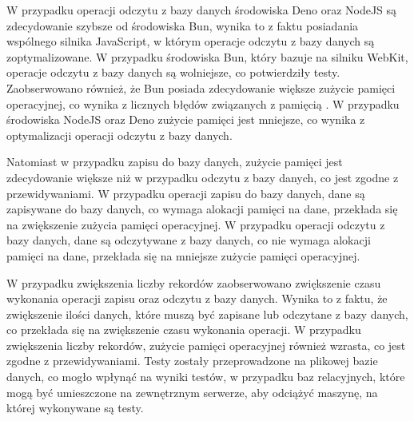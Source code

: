 W przypadku operacji odczytu z bazy danych środowiska Deno oraz NodeJS są zdecydowanie szybsze od środowiska Bun, wynika to z faktu posiadania wspólnego silnika JavaScript, w którym operacje odczytu z bazy danych są zoptymalizowane. W przypadku środowiska Bun, który bazuje na silniku WebKit, operacje odczytu z bazy danych są wolniejsze, co potwierdziły testy. Zaobserwowano również, że Bun posiada zdecydowanie większe zużycie pamięci operacyjnej, co wynika z licznych błędów związanych z pamięcią \cite{bun_memory}. W przypadku środowiska NodeJS oraz Deno zużycie pamięci jest mniejsze, co wynika z optymalizacji operacji odczytu z bazy danych.

Natomiast w przypadku zapisu do bazy danych, zużycie pamięci jest zdecydowanie większe niż w przypadku odczytu z bazy danych, co jest zgodne z przewidywaniami. W przypadku operacji zapisu do bazy danych, dane są zapisywane do bazy danych, co wymaga alokacji pamięci na dane, przekłada się na zwiększenie zużycia pamięci operacyjnej. W przypadku operacji odczytu z bazy danych, dane są odczytywane z bazy danych, co nie wymaga alokacji pamięci na dane, przekłada się na mniejsze zużycie pamięci operacyjnej.

W przypadku zwiększenia liczby rekordów zaobserwowano zwiększenie czasu wykonania operacji zapisu oraz odczytu z bazy danych. Wynika to z faktu, że zwiększenie ilości danych, które muszą być zapisane lub odczytane z bazy danych, co przekłada się na zwiększenie czasu wykonania operacji. W przypadku zwiększenia liczby rekordów, zużycie pamięci operacyjnej również wzrasta, co jest zgodne z przewidywaniami. Testy zostały przeprowadzone na plikowej bazie danych, co mogło wpłynąć na wyniki testów, w przypadku baz relacyjnych, które mogą być umieszczone na zewnętrznym serwerze, aby odciążyć maszynę, na której wykonywane są testy.
